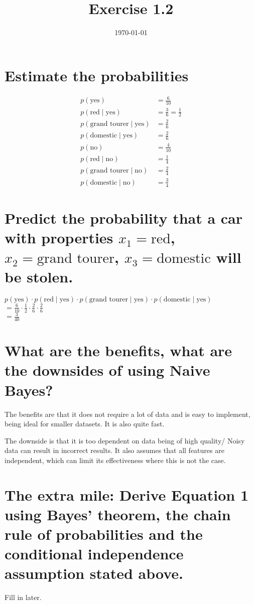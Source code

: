 \documentclass{article}
\title{Exercise 1.2}
\date{\today}
\begin{document}
\maketitle

\section{Estimate the probabilities}

\begin{align}
    p(\text{yes}) &= \frac{6}{10} \\
    p(\text{red} \mid \text{yes}) &= \frac{3}{6} = \frac{1}{2} \\
    p(\text{grand tourer} \mid \text{yes}) &= \frac{2}{6} \\
    p(\text{domestic} \mid \text{yes}) &= \frac{2}{6} \\
    p(\text{no}) &= \frac{4}{10} \\
    p(\text{red} \mid \text{no}) &= \frac{1}{4} \\
    p(\text{grand tourer} \mid \text{no}) &= \frac{2}{4} \\
    p(\text{domestic} \mid \text{no}) &= \frac{3}{4}
\end{align}

\section{Predict the probability that a car with properties \( x_1 = \text{red} \), \( x_2 = \text{grand tourer} \), \( x_3 = \text{domestic} \) will be stolen.
}

\begin{center}
    \( p(\text{yes}) \cdot p(\text{red} \mid \text{yes}) \cdot p(\text{grand tourer} \mid \text{yes}) \cdot p(\text{domestic} \mid \text{yes}) \) \\
    \( = \frac{6}{10} \cdot \frac{1}{2} \cdot \frac{2}{6} \cdot \frac{2}{6} \) \\
    \( = \frac{3}{40} \)
\end{center}

\section{What are the benefits, what are the downsides of using Naive
Bayes?}

The benefits are that it does not require a lot of data and is easy to implement, being ideal for smaller datasets. It is also quite fast.

The downside is that it is too dependent on data being of high quality/ Noisy data can result in incorrect results. It also assumes that all features are independent, which can limit its effectiveness where this is not the case. 

\section{The extra mile: Derive Equation 1 using Bayes’ theorem, the chain rule of probabilities and the conditional independence assumption stated above.}

Fill in later.
\end{document}
